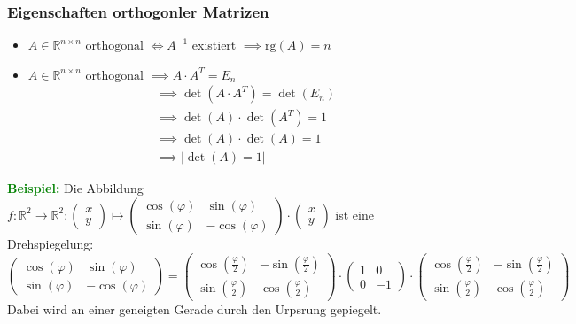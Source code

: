\documentclass{article}
\newcommand{\green}[1]{\textcolor{green}{#1}}
\newcommand{\ex}{\green{\textbf{Beispiel: }}}
\newcommand{\R}{\mathbb{R}}
\newcommand{\vvec}[2]{\begin{pmatrix}#1\\#2\end{pmatrix}}
\newcommand{\rg}{\text{rg}}
\begin{document}
\subsubsection{Eigenschaften orthogonler Matrizen}

\begin{itemize}
    \item $A \in \R^{n \times n} \text{ orthogonal } \iff A^{-1}$ existiert $\implies \rg(A) = n$
    \item $A \in \R^{n \times n} \text{ orthogonal } \implies A \cdot A^T = E_n$
    \begin{align*}
        &\implies \det(A \cdot A^T) = \det(E_n)\\
        &\implies \det(A) \cdot \det(A^T) = 1\\
        &\implies \det(A) \cdot \det(A) = 1\\
        &\implies |\det(A) = 1|
    \end{align*}
\end{itemize}

\ex Die Abbildung $f: \R^2 \to \R^2: \vvec{x}{y} \mapsto \begin{pmatrix}
    \cos(\varphi) & \sin(\varphi)\\
    \sin(\varphi) & -\cos(\varphi)
\end{pmatrix} \cdot \vvec{x}{y}$ ist eine Drehspiegelung:
\[
    \begin{pmatrix}
        \cos(\varphi) & \sin(\varphi)\\
        \sin(\varphi) & -\cos(\varphi)
    \end{pmatrix} = \begin{pmatrix}
        \cos(\frac{\varphi}{2}) & -\sin(\frac{\varphi}{2})\\
        \sin(\frac{\varphi}{2}) & \cos(\frac{\varphi}{2})
    \end{pmatrix} \cdot \begin{pmatrix}
        1 & 0\\
        0 & -1
    \end{pmatrix} \cdot \begin{pmatrix}
        \cos(\frac{\varphi}{2}) & -\sin(\frac{\varphi}{2})\\
        \sin(\frac{\varphi}{2}) & \cos(\frac{\varphi}{2})
    \end{pmatrix}
\]
Dabei wird an einer geneigten Gerade durch den Urpsrung gepiegelt.
\end{document}
